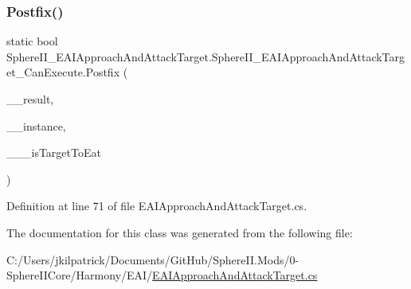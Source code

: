 \subsubsection{\texorpdfstring{Postfix()}{Postfix()}}
{\footnotesize\ttfamily static bool Sphere\+I\+I\+\_\+\+E\+A\+I\+Approach\+And\+Attack\+Target.\+Sphere\+I\+I\+\_\+\+E\+A\+I\+Approach\+And\+Attack\+Target\+\_\+\+Can\+Execute.\+Postfix (\begin{DoxyParamCaption}\item[{bool}]{\+\_\+\+\_\+result,  }\item[{E\+A\+I\+Approach\+And\+Attack\+Target}]{\+\_\+\+\_\+instance,  }\item[{ref bool}]{\+\_\+\+\_\+\+\_\+is\+Target\+To\+Eat }\end{DoxyParamCaption})\hspace{0.3cm}{\ttfamily [static]}}



Definition at line 71 of file E\+A\+I\+Approach\+And\+Attack\+Target.\+cs.



The documentation for this class was generated from the following file\+:\begin{DoxyCompactItemize}
\item 
C\+:/\+Users/jkilpatrick/\+Documents/\+Git\+Hub/\+Sphere\+I\+I.\+Mods/0-\/\+Sphere\+I\+I\+Core/\+Harmony/\+E\+A\+I/\mbox{\hyperlink{_e_a_i_approach_and_attack_target_8cs}{E\+A\+I\+Approach\+And\+Attack\+Target.\+cs}}\end{DoxyCompactItemize}
